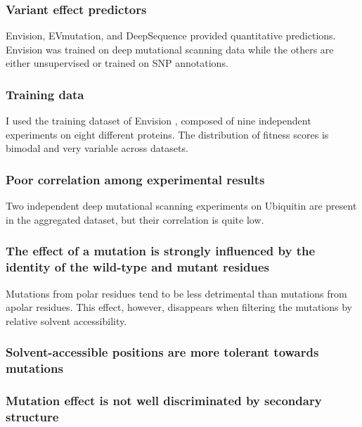\documentclass[10pt, british]{beamer}
\begin{document}
\begin{frame}
	\frametitle{Variant effect predictors}
	\begin{figure}
		
	\end{figure}
	\vfill%
	Envision, EVmutation, and DeepSequence provided quantitative predictions.
	Envision was trained on deep mutational scanning data while the others are either unsupervised or trained on SNP annotations.
\end{frame}

\begin{frame}
	\frametitle{Training data}
	I used the training dataset of Envision \parencite{Gray2018}, composed of nine independent experiments on eight different proteins.
	The distribution of fitness scores is bimodal and very variable across datasets.
	\vfill%
	\centering%
	
	
\end{frame}

\begin{frame}
	\frametitle{Poor correlation among experimental results}
	Two independent deep mutational scanning experiments on Ubiquitin are present in the aggregated dataset, but their correlation is quite low.
	\vfill%
	\centering%
	
\end{frame}

\begin{frame}
	\frametitle{The effect of a mutation is strongly influenced by the identity of the wild-type and mutant residues}
	Mutations from polar residues tend to be less detrimental than mutations from apolar residues.
	This effect, however, disappears when filtering the mutations by relative solvent accessibility.
	\vfill%
	\centering%
	
\end{frame}

\begin{frame}
	\frametitle{Solvent-accessible positions are more tolerant towards mutations}
	\vfill%
	\centering%
	
\end{frame}

\begin{frame}
	\frametitle{Mutation effect is not well discriminated by secondary structure}
	\vfill%
	\centering%
	
\end{frame}
\end{document}
